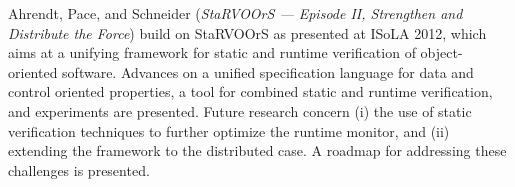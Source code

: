 

Ahrendt, Pace, and Schneider
\cite{isola-2016-ahrendt}
({\em StaRVOOrS — Episode II, Strengthen and Distribute the Force})
build on StaRVOOrS as presented at ISoLA 2012, which aims at a unifying framework for static and runtime verification of object-oriented software. 
Advances on a unified
specification language for data and control oriented properties, a
tool for combined static and runtime verification, and experiments are
presented. Future research concern (i) the use of static verification techniques to further optimize the runtime monitor, and (ii) extending the framework to the distributed case. A roadmap for addressing these challenges is presented.

